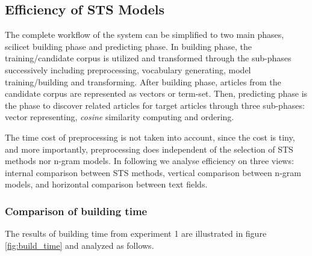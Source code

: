\bigbreak


\subsection{Efficiency of STS Models}
\label{sec:5.3}

The complete workflow of the system can be simplified to two main phases, scilicet building phase and predicting phase. In building phase, the training/candidate corpus is utilized and transformed through the sub-phases successively including preprocessing, vocabulary generating, model training/building and transforming. After building phase, articles from the candidate corpus are represented as vectors or term-set. Then, predicting phase is the phase to discover related articles for target articles through three sub-phases: vector representing, \textit{cosine} similarity computing and ordering. 

The time cost of preprocessing is not taken into account, since the cost is tiny, and more importantly, preprocessing does independent of the selection of STS methods nor n-gram models. In following we analyse efficiency on three views: internal comparison between STS methods, vertical comparison between n-gram models, and horizontal comparison between text fields. 

\subsubsection{Comparison of building time}



The results of building time from experiment 1 are illustrated in figure \ref{fig:build_time} and analyzed as follows. 

